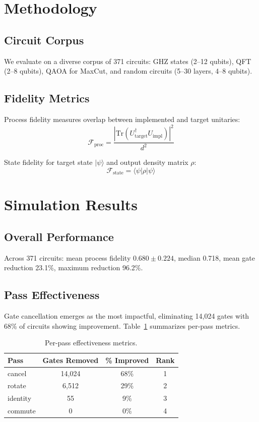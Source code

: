\documentclass[journal]{IEEEtran}
\newcommand{\ket}[1]{|#1\rangle}
\newcommand{\bra}[1]{\langle#1|}
\newcommand{\fid}{\mathcal{F}}
\begin{document}
\section{Methodology}

\subsection{Circuit Corpus}

We evaluate on a diverse corpus of 371 circuits: GHZ states (2--12 qubits), QFT (2--8 qubits), QAOA for MaxCut, and random circuits (5--30 layers, 4--8 qubits).

\subsection{Fidelity Metrics}

Process fidelity measures overlap between implemented and target unitaries:
\begin{equation}
    \fid_{\text{proc}} = \frac{|\text{Tr}(U_{\text{target}}^{\dagger} U_{\text{impl}})|^2}{d^2}
\end{equation}

State fidelity for target state $\ket{\psi}$ and output density matrix $\rho$:
\begin{equation}
    \fid_{\text{state}} = \bra{\psi}\rho\ket{\psi}
\end{equation}

\section{Simulation Results}

\subsection{Overall Performance}

Across 371 circuits: mean process fidelity $0.680 \pm 0.224$, median 0.718, mean gate reduction 23.1\%, maximum reduction 96.2\%.

\subsection{Pass Effectiveness}

Gate cancellation emerges as the most impactful, eliminating 14,024 gates with 68\% of circuits showing improvement. Table~\ref{tab:passes} summarizes per-pass metrics.

\begin{table}[t]
\caption{Per-pass effectiveness metrics.}
\label{tab:passes}
\centering
\begin{tabular}{lccc}
\hline
Pass & Gates Removed & \% Improved & Rank \\
\hline
cancel & 14,024 & 68\% & 1 \\
rotate & 6,512 & 29\% & 2 \\
identity & 55 & 9\% & 3 \\
commute & 0 & 0\% & 4 \\
\hline
\end{tabular}
\end{table}
\end{document}
